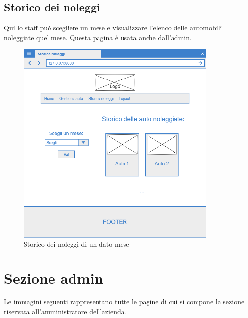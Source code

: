 \documentclass[12pt,a4paperS]{report}
\begin{document}
\begin{normalsize}
			\subsection{Storico dei noleggi}
				Qui lo staff può scegliere un mese e visualizzare l'elenco delle automobili noleggiate quel mese.
				\newline
				Questa pagina è usata anche dall'admin.
				\begin{figure}[H]
					\centering
					\includegraphics[width=0.88\textwidth, height=0.88\textheight, keepaspectratio]{Mockup/Storico_noleggi_staff.png}
					\caption{Storico dei noleggi di un dato mese}
				\end{figure}
				
		\section{Sezione admin}
			Le immagini seguenti rappresentano tutte le pagine di cui si compone la sezione riservata all'amministratore dell'azienda.
			

\end{normalsize}
\end{document}
